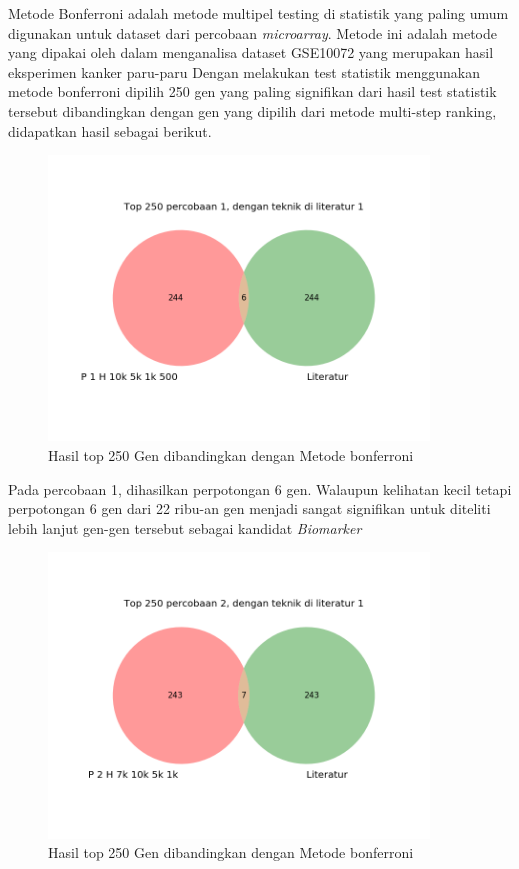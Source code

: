 Metode Bonferroni adalah metode multipel testing di statistik yang paling umum digunakan untuk dataset dari percobaan \textit{microarray}. Metode ini adalah metode yang dipakai oleh \cite{landi2008gene} dalam menganalisa dataset GSE10072 yang merupakan hasil eksperimen kanker paru-paru \citep{landi2008gene} Dengan melakukan test statistik menggunakan metode bonferroni dipilih 250 gen yang paling signifikan dari hasil test statistik tersebut dibandingkan dengan gen yang dipilih dari metode multi-step ranking, didapatkan hasil sebagai berikut.

\begin{figure}
	\centering
	\includegraphics[width=0.9\textwidth]
		{pics/bon1.png}
	\caption{Hasil top 250 Gen dibandingkan dengan Metode bonferroni}
	\label{fig:bon1}
\end{figure}

Pada percobaan 1, dihasilkan perpotongan 6 gen. Walaupun kelihatan kecil tetapi perpotongan 6 gen dari 22 ribu-an gen menjadi sangat signifikan untuk diteliti lebih lanjut gen-gen tersebut sebagai kandidat \textit{Biomarker}

\begin{figure}
	\centering
	\includegraphics[width=0.9\textwidth]
		{pics/bon2.png}
	\caption{Hasil top 250 Gen dibandingkan dengan Metode bonferroni}
	\label{fig:bon1}
\end{figure}

